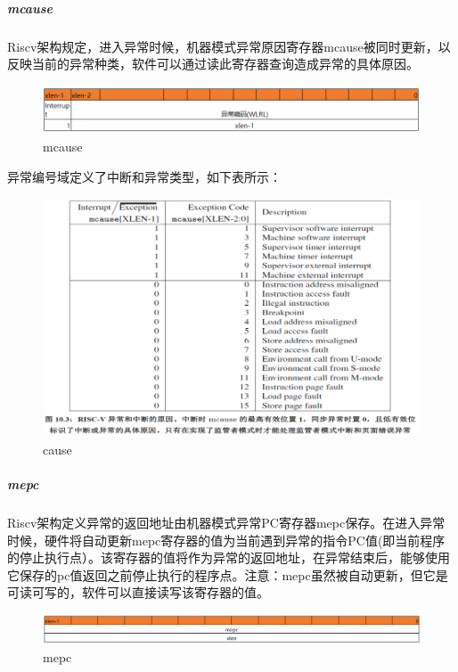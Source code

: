 \subparagraph{mcause}
Riscv架构规定，进入异常时候，机器模式异常原因寄存器mcause被同时更新，以反映当前的异常种类，软件可以通过读此寄存器查询造成异常的具体原因。

\begin{figure}[H] %
    \centering %
    \includegraphics[width=1.0\textwidth]{figs/mcause.png} %
    \caption{mcause} %
    \label{Fig.4} %
\end{figure}

异常编号域定义了中断和异常类型，如下表所示：

\begin{figure}[H] %
    \centering %
    \includegraphics[width=1.0\textwidth]{figs/cause.png} %
    \caption{cause} %
    \label{Fig.5} %
\end{figure}

\subparagraph{mepc}
Riscv架构定义异常的返回地址由机器模式异常PC寄存器mepc保存。在进入异常时候，硬件将自动更新mepc寄存器的值为当前遇到异常的指令PC值(即当前程序的停止执行点）。该寄存器的值将作为异常的返回地址，在异常结束后，能够使用它保存的pc值返回之前停止执行的程序点。注意：mepc虽然被自动更新，但它是可读可写的，软件可以直接读写该寄存器的值。

\begin{figure}[H] %
    \centering %
    \includegraphics[width=1.0\textwidth]{figs/mepc.png} %
    \caption{mepc} %
    \label{Fig.6} %
\end{figure}

